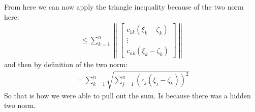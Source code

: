 \documentclass[12pt]{article}
\newcommand{\norm}[1]{\left\lVert#1\right\rVert}
\theoremstyle{definition}
\theoremstyle{remark}
\begin{document}
From here we can now apply the triangle inequality because of the two norm here:
\begin{align}
	\leq \sum_{k=1}^n\norm{\begin{bmatrix}
			                       c_{1k}(\xi_k-\zeta_k) \\
			                       \vdots                \\
			                       c_{nk}(\xi_k-\zeta_k)
		                       \end{bmatrix}}
\end{align}
and then by definition of the two norm:
\begin{align}
	=\sum_{k=1}^n\sqrt{\sum_{j=1}^n(c_j(\xi_j-\zeta_k))^2}
\end{align}
So that is how we were able to pull out the sum. Is because there was a hidden two norm.
\end{document}
